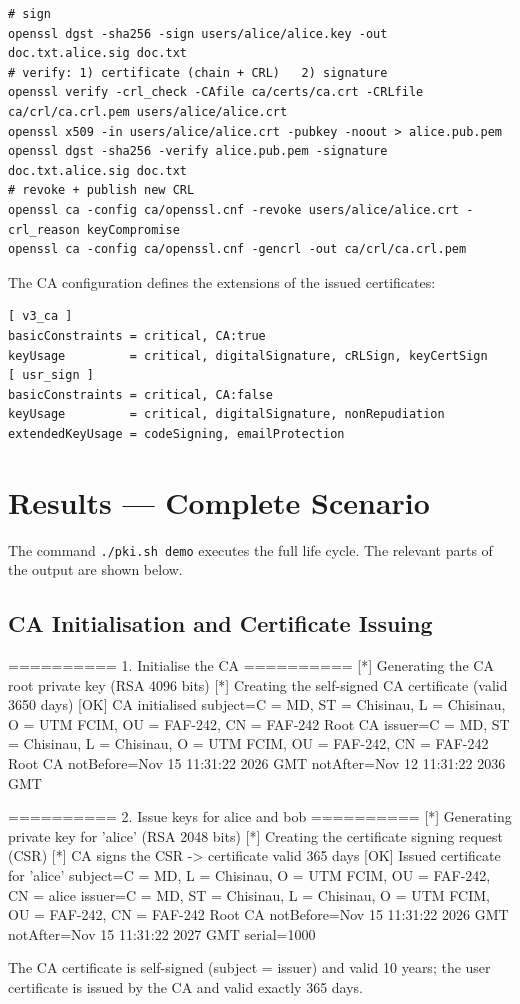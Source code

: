 \documentclass[12pt,a4paper]{article}
\begin{document}
\begin{lstlisting}[style=sh, caption={Signing, verification and revocation}]
# sign
openssl dgst -sha256 -sign users/alice/alice.key -out doc.txt.alice.sig doc.txt
# verify: 1) certificate (chain + CRL)   2) signature
openssl verify -crl_check -CAfile ca/certs/ca.crt -CRLfile ca/crl/ca.crl.pem users/alice/alice.crt
openssl x509 -in users/alice/alice.crt -pubkey -noout > alice.pub.pem
openssl dgst -sha256 -verify alice.pub.pem -signature doc.txt.alice.sig doc.txt
# revoke + publish new CRL
openssl ca -config ca/openssl.cnf -revoke users/alice/alice.crt -crl_reason keyCompromise
openssl ca -config ca/openssl.cnf -gencrl -out ca/crl/ca.crl.pem
\end{lstlisting}

The CA configuration defines the extensions of the issued certificates:
\begin{lstlisting}[style=sh, numbers=none, caption={Certificate extensions (\texttt{openssl.cnf})}]
[ v3_ca ]
basicConstraints = critical, CA:true
keyUsage         = critical, digitalSignature, cRLSign, keyCertSign
[ usr_sign ]
basicConstraints = critical, CA:false
keyUsage         = critical, digitalSignature, nonRepudiation
extendedKeyUsage = codeSigning, emailProtection
\end{lstlisting}

\section{Results — Complete Scenario}
The command \texttt{./pki.sh demo} executes the full life cycle. The relevant parts of the output
are shown below.

\subsection{CA Initialisation and Certificate Issuing}
\begin{terminal}
\begin{termout}
========== 1. Initialise the CA ==========
[*] Generating the CA root private key (RSA 4096 bits)
[*] Creating the self-signed CA certificate (valid 3650 days)
[OK] CA initialised
subject=C = MD, ST = Chisinau, L = Chisinau, O = UTM FCIM, OU = FAF-242, CN = FAF-242 Root CA
issuer=C = MD, ST = Chisinau, L = Chisinau, O = UTM FCIM, OU = FAF-242, CN = FAF-242 Root CA
notBefore=Nov 15 11:31:22 2026 GMT
notAfter=Nov 12 11:31:22 2036 GMT

========== 2. Issue keys for alice and bob ==========
[*] Generating private key for 'alice' (RSA 2048 bits)
[*] Creating the certificate signing request (CSR)
[*] CA signs the CSR -> certificate valid 365 days
[OK] Issued certificate for 'alice'
subject=C = MD, L = Chisinau, O = UTM FCIM, OU = FAF-242, CN = alice
issuer=C = MD, ST = Chisinau, L = Chisinau, O = UTM FCIM, OU = FAF-242, CN = FAF-242 Root CA
notBefore=Nov 15 11:31:22 2026 GMT
notAfter=Nov 15 11:31:22 2027 GMT
serial=1000
\end{termout}
\end{terminal}
The CA certificate is self-signed (subject = issuer) and valid 10 years; the user certificate is
issued by the CA and valid exactly 365 days.
\end{document}

